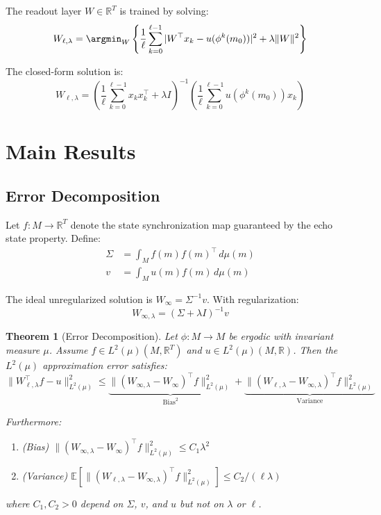 \documentclass[11pt]{article}
\newtheorem{theorem}{Theorem}
\theoremstyle{definition}
\theoremstyle{remark}
\begin{document}
The readout layer $W \in \mathbb{R}^T$ is trained by solving:
\begin{equation}
W_{\ell, \lambda} = \argmin_{W} \left\{ \frac{1}{\ell}\sum_{k=0}^{\ell-1} |W^\top x_k - u(\phi^k(m_0))|^2 + \lambda \|W\|^2 \right\}
\end{equation}

The closed-form solution is:
\begin{equation}
W_{\ell, \lambda} = \left(\frac{1}{\ell}\sum_{k=0}^{\ell-1} x_k x_k^\top + \lambda I\right)^{-1} \left(\frac{1}{\ell}\sum_{k=0}^{\ell-1} u(\phi^k(m_0)) x_k\right)
\end{equation}

\section{Main Results}

\subsection{Error Decomposition}

Let $f: M \to \mathbb{R}^T$ denote the state synchronization map guaranteed by the echo state property. Define:
\begin{align}
\Sigma &= \int_M f(m)f(m)^\top \, d\mu(m) \\
v &= \int_M u(m) f(m) \, d\mu(m)
\end{align}

The ideal unregularized solution is $W_\infty = \Sigma^{-1} v$. With regularization:
\begin{equation}
W_{\infty, \lambda} = (\Sigma + \lambda I)^{-1} v
\end{equation}

\begin{theorem}[Error Decomposition]
\label{thm:error_decomposition}
Let $\phi: M \to M$ be ergodic with invariant measure $\mu$. Assume $f \in L^2(\mu)(M, \mathbb{R}^T)$ and $u \in L^2(\mu)(M, \mathbb{R})$. Then the $L^2(\mu)$ approximation error satisfies:
\begin{equation}
\|W_{\ell,\lambda}^\top f - u\|_{L^2(\mu)}^2 \leq \underbrace{\|(W_{\infty,\lambda} - W_\infty)^\top f\|_{L^2(\mu)}^2}_{\text{Bias}^2} + \underbrace{\|(W_{\ell,\lambda} - W_{\infty,\lambda})^\top f\|_{L^2(\mu)}^2}_{\text{Variance}}
\end{equation}

Furthermore:
\begin{enumerate}
\item (Bias) $\|(W_{\infty,\lambda} - W_\infty)^\top f\|_{L^2(\mu)}^2 \leq C_1 \lambda^2$
\item (Variance) $\mathbb{E}[\|(W_{\ell,\lambda} - W_{\infty,\lambda})^\top f\|_{L^2(\mu)}^2] \leq C_2 / (\ell \lambda)$
\end{enumerate}
where $C_1, C_2 > 0$ depend on $\Sigma$, $v$, and $u$ but not on $\lambda$ or $\ell$.
\end{theorem}
\end{document}
